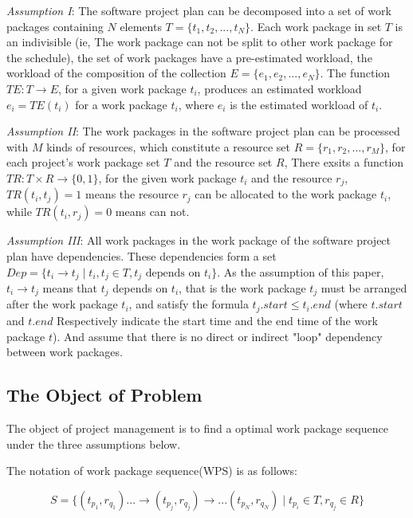 \emph{Assumption I}: The software project plan can be decomposed into
a set of work packages containing $N$ elements $T = \{t_1, t_2, ...,
t_N \}$.  Each work package in set $T$ is an indivisible (ie, The work
package can not be split to other work package for the schedule), the
set of work packages have a pre-estimated workload, the workload of
the composition of the collection $E = \{e_1, e_2, ..., e_N \}$.  The
function $TE: T \rightarrow E$, for a given work package $t_i$,
produces an estimated workload $e_i = TE(t_i)$ for a work package
$t_i$, where $e_i$ is the estimated workload of $t_i$.


\emph{Assumption II}: The work packages in the software project plan
can be processed with $M$ kinds of resources, which constitute a
resource set $R = \{r_1, r_2, ..., r_M \}$, for each project's work
package set $T$ and the resource set $R$, There exsits a function
$TR: T \times R \rightarrow \{0, 1\}$, for the given work package $t_i$
and the resource $r_j$, $TR(t_i, t_j) = 1$ means the resource $r_j$ can
be allocated to the work package $t_i$, while $TR (t_i, r_j) = 0$ means
can not.


\emph{Assumption III}: All work packages in the work package of the
software project plan have dependencies.  These dependencies form a set
$Dep= \{t_i \rightarrow t_j \mid t_i, t_j \in T, t_j \text{ depends on } t_i\}$.
As the assumption of this paper, $t_i \rightarrow t_j$ means that
$t_j$ depends on $t_i$, that is the work package $t_j$ must be
arranged after the work package $t_i$, and satisfy the formula
$t_j.start \leq t_i.end$ (where $t.start$ and $t.end$ Respectively
indicate the start time and the end time of the work package $t$).
And assume that there is no direct or indirect "loop" dependency
between work packages.


\subsection{The Object of Problem}
%
The object of project management is to find a optimal work package sequence
under the three assumptions below.

The notation of work package sequence(WPS) is as follows:

\begin{equation}
  S = \{
  (t_{p_1}, r_{q_1}) ... \rightarrow (t_{p_j}, r_{q_j}) \rightarrow ... (t_{p_N}, r_{q_N})
  \mid t_{p_i} \in T, r_{q_j} \in R
  \}
  \label{wps}
\end{equation}

